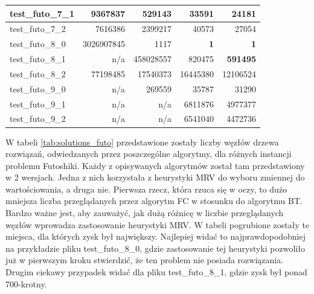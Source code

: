 \documentclass{article}
\begin{document}
\begin{table}[H]
\begin{center}
\begin{tabular}{|l|r|r|r|r|}
				test\_futo\_7\_1 & 9367837                          & 529143                           & 33591                                & 24181                                \\ \hline
				test\_futo\_7\_2 & 7616386                          & 2399217                          & 40573                                & 27054                                \\ \hline
				test\_futo\_8\_0 & 3026907845                       & 1117                             & \textbf{1}                           & \textbf{1}                           \\ \hline
				test\_futo\_8\_1 & n/a                              & 458028557                        & 820475                               & \textbf{591495}                      \\ \hline
				test\_futo\_8\_2 & 77198485                         & 17540373                         & 16445380                             & 12106524                             \\ \hline
				test\_futo\_9\_0 & n/a                              & 269559                           & 35787                                & 31290                                \\ \hline
				test\_futo\_9\_1 & n/a                              & n/a                              & 6811876                              & 4977377                              \\ \hline
				test\_futo\_9\_2 & n/a                              & n/a                              & 6541040                              & 4472736                              \\ \hline
			\end{tabular}
		\end{center}
	\end{table}
	
	W tabeli \ref{tab:solutions_futo} przedstawione zostały liczby węzłów drzewa rozwiązań, odwiedzanych przez poszczególne algorytmy, dla różnych instancji problemu Futoshiki. Każdy z opisywanych algorytmów został tam przedstawiony w 2 wersjach. Jedna z nich korzystała z heurystyki MRV do wyboru zmiennej do wartościowania, a druga nie. 
	Pierwsza rzecz, która rzuca się w oczy, to dużo mniejsza liczba przeglądanych przez algorytm FC w stosunku do algorytmu BT. Bardzo ważne jest, aby zauważyć, jak dużą różnicę w liczbie przeglądanych węzłów wprowadza zastosowanie heurystyki MRV. W tabeli pogrubione zostały te miejsca, dla których zysk był największy. Najlepiej widać to najprawdopodobniej na przykładzie pliku test\_futo\_8\_0, gdzie zastosowanie tej heurystyki pozwoliło już w pierwszym kroku stwierdzić, że ten problem nie posiada rozwiązania. Drugim ciekawy przypadek widać dla pliku test\_futo\_8\_1, gdzie zysk był ponad 700-krotny.
	
\end{document}
